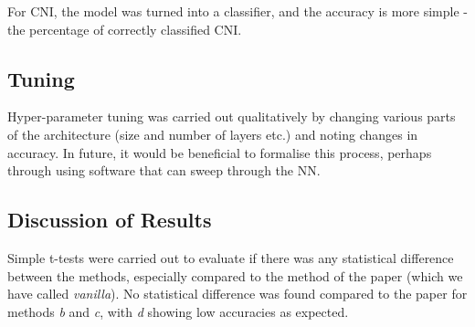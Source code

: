 \documentclass{article}
\begin{document}
\noindent For CNI, the model was turned into a classifier, and the accuracy is more simple - the percentage of correctly classified CNI.
\subsection{Tuning}
Hyper-parameter tuning was carried out qualitatively by changing various parts of the architecture (size and number of layers etc.) and noting changes in accuracy. In future, it would be beneficial to formalise this process, perhaps through using software that can sweep through the NN.

\subsection{Discussion of Results}
Simple t-tests were carried out to evaluate if there was any statistical difference between the methods, especially compared to the method of the paper (which we have called \emph{vanilla}). No statistical difference was found compared to the paper for methods \emph{b} and \emph{c}, with \emph{d} showing low accuracies as expected. \\


\newpage


\end{document}
